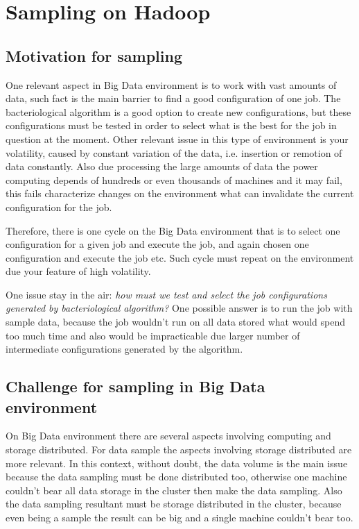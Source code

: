 \chapter{Sampling on Hadoop} %
\label{cha:sample}

\section{Motivation for sampling}

One relevant aspect in Big Data environment is to work with vast amounts of data,
such fact is the main barrier to find a good configuration of one job. The bacteriological
algorithm is a good option to create new configurations, but these configurations
must be tested in order to select what is the best for the job in question at the
moment. Other relevant issue in this type of environment is your volatility, caused
by constant variation of the data, i.e. insertion or remotion of data constantly.
Also due processing the large amounts of data the power computing depends of hundreds
or even thousands of machines and it may fail, this fails characterize changes on
the environment what can invalidate the current configuration for the job.

Therefore, there is one cycle on the Big Data environment that is to select one
configuration for a given job and execute the job, and again chosen one configuration
and execute the job etc. Such cycle must repeat on the environment due your feature
of high volatility.

One issue stay in the air: {\it how must we test and select the job configurations
generated by bacteriological algorithm?} One possible answer is to run the job with
sample data, because the job wouldn't run on all data stored what would spend too
much time and also would be impracticable due larger number of intermediate
configurations generated by the algorithm.

\section{Challenge for sampling in Big Data environment}

On Big Data environment there are several aspects involving computing and storage
distributed. For data sample the aspects involving storage distributed are more
relevant. In this context, without doubt, the data volume is the main issue because
the data sampling must be done distributed too, otherwise one machine couldn't bear
all data storage in the cluster then make the data sampling. Also the data sampling
resultant must be storage distributed in the cluster, because even being a sample
the result can be big and a single machine couldn't bear too.

